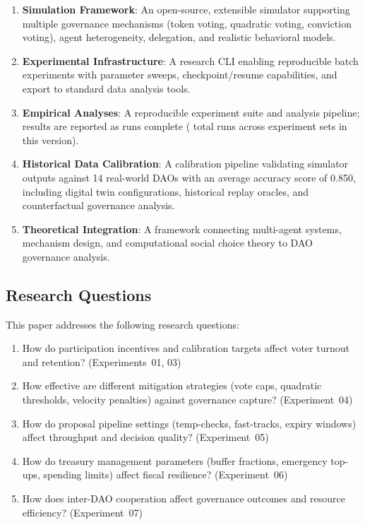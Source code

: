 \begin{enumerate}
    \item \textbf{Simulation Framework}: An open-source, extensible simulator supporting multiple governance mechanisms (token voting, quadratic voting, conviction voting), agent heterogeneity, delegation, and realistic behavioral models.

    \item \textbf{Experimental Infrastructure}: A research CLI enabling reproducible batch experiments with parameter sweeps, checkpoint/resume capabilities, and export to standard data analysis tools.

    \item \textbf{Empirical Analyses}: A reproducible experiment suite and analysis pipeline; results are reported as runs complete (\totalruns{} total runs across \experimentcount{} experiment sets in this version).

    \item \textbf{Historical Data Calibration}: A calibration pipeline validating simulator outputs against 14 real-world DAOs with an average accuracy score of 0.850, including digital twin configurations, historical replay oracles, and counterfactual governance analysis.

    \item \textbf{Theoretical Integration}: A framework connecting multi-agent systems, mechanism design, and computational social choice theory to DAO governance analysis.
\end{enumerate}

\subsection{Research Questions}

This paper addresses the following research questions:

\begin{enumerate}[label=\textbf{RQ\arabic*}:]
    \item How do participation incentives and calibration targets affect voter turnout and retention? (Experiments~01, 03)
    \item How effective are different mitigation strategies (vote caps, quadratic thresholds, velocity penalties) against governance capture? (Experiment~04)
    \item How do proposal pipeline settings (temp-checks, fast-tracks, expiry windows) affect throughput and decision quality? (Experiment~05)
    \item How do treasury management parameters (buffer fractions, emergency top-ups, spending limits) affect fiscal resilience? (Experiment~06)
    \item How does inter-DAO cooperation affect governance outcomes and resource efficiency? (Experiment~07)
\end{enumerate}

